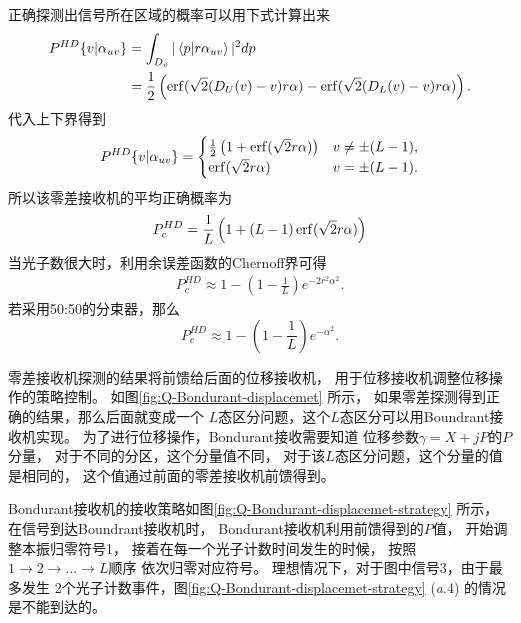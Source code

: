 正确探测出信号所在区域的概率可以用下式计算出来
\begin{equation}
\begin{split}
P^{HD}\{v|\alpha_{uv}\} &= \int_{D_v}|\bra{p}\ket{r\alpha_{uv}}|^2 dp  \\
   &= \frac{1}{2} \left( \erf(\sqrt{2} (D_U(v)-v) r\alpha) -  \erf(\sqrt{2} (D_L(v)-v) r\alpha) \right).
\end{split}
\end{equation}
代入上下界得到
\begin{equation}
\begin{split}
P^{HD}\{v|\alpha_{uv}\} = \begin{cases}
                            \frac{1}{2}\left( 1 + \erf(\sqrt{2}r\alpha) \right)  & v \neq \pm (L-1), \\
                            \erf(\sqrt{2}r\alpha) & v = \pm (L-1).
                          \end{cases}
\end{split}
\end{equation}
所以该零差接收机的平均正确概率为
\begin{equation}
P_c^{HD} = \frac{1}{L}\left(1 + (L-1)\erf(\sqrt{2}r\alpha) \right)
\end{equation}
当光子数很大时，利用余误差函数的Chernoff界\cite{chang2011chernoff}可得
\begin{equation}
\begin{split}
P_c^{HD} \approx 1 - (1-\frac{1}{L}) e^{-2r^2\alpha^2}.
\end{split}
\label{eq:QAM-Hybrid-approx-1}
\end{equation}
若采用50:50的分束器，那么
\begin{equation}
P_c^{HD} \approx 1 - (1-\frac{1}{L}) e^{-\alpha^2}.
\end{equation}


零差接收机探测的结果将前馈给后面的位移接收机，
用于位移接收机调整位移操作的策略控制。
如图\ref{fig:Q-Bondurant-displacemet} 所示，
如果零差探测得到正确的结果，那么后面就变成一个
$L$态区分问题，这个$L$态区分可以用Boundrant接收机实现。
为了进行位移操作，Bondurant接收需要知道
位移参数$\gamma = X + jP$的$P$分量，
对于不同的分区，这个分量值不同，
对于该$L$态区分问题，这个分量的值是相同的，
这个值通过前面的零差接收机前馈得到。



Bondurant接收机的接收策略如图\ref{fig:Q-Bondurant-displacemet-strategy}  所示，
在信号到达Boundrant接收机时，
Bondurant接收机利用前馈得到的$P$值，
开始调整本振归零符号1，
接着在每一个光子计数时间发生的时候，
按照$1\rightarrow 2 \rightarrow ... \rightarrow L$顺序
依次归零对应符号。
理想情况下，对于图中信号3，由于最多发生
2个光子计数事件，图\ref{fig:Q-Bondurant-displacemet-strategy} (\textit{a}.4)
的情况是不能到达的。

